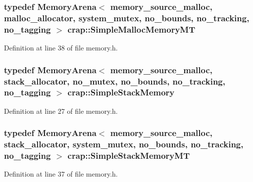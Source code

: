 \hypertarget{namespacecrap_a86d2d770530309cb5cb92249b5efadcb}{
\subsubsection[{Simple\+Malloc\+Memory\+M\+T}]{\setlength{\rightskip}{0pt plus 5cm}typedef {\bf Memory\+Arena}$<$ {\bf memory\+\_\+source\+\_\+malloc}, {\bf malloc\+\_\+allocator}, {\bf system\+\_\+mutex}, {\bf no\+\_\+bounds}, {\bf no\+\_\+tracking}, {\bf no\+\_\+tagging} $>$ {\bf crap\+::\+Simple\+Malloc\+Memory\+M\+T}}}\label{namespacecrap_a86d2d770530309cb5cb92249b5efadcb}


Definition at line 38 of file memory.\+h.

\hypertarget{namespacecrap_a1265b2d1470f9e9196ec1ffcb2fd0701}{
\subsubsection[{Simple\+Stack\+Memory}]{\setlength{\rightskip}{0pt plus 5cm}typedef {\bf Memory\+Arena}$<$ {\bf memory\+\_\+source\+\_\+malloc}, {\bf stack\+\_\+allocator}, {\bf no\+\_\+mutex}, {\bf no\+\_\+bounds}, {\bf no\+\_\+tracking}, {\bf no\+\_\+tagging} $>$ {\bf crap\+::\+Simple\+Stack\+Memory}}}\label{namespacecrap_a1265b2d1470f9e9196ec1ffcb2fd0701}


Definition at line 27 of file memory.\+h.

\hypertarget{namespacecrap_aa7a4e4bf8df096c0ab06b0fdbf4c3c0f}{
\subsubsection[{Simple\+Stack\+Memory\+M\+T}]{\setlength{\rightskip}{0pt plus 5cm}typedef {\bf Memory\+Arena}$<$ {\bf memory\+\_\+source\+\_\+malloc}, {\bf stack\+\_\+allocator}, {\bf system\+\_\+mutex}, {\bf no\+\_\+bounds}, {\bf no\+\_\+tracking}, {\bf no\+\_\+tagging} $>$ {\bf crap\+::\+Simple\+Stack\+Memory\+M\+T}}}\label{namespacecrap_aa7a4e4bf8df096c0ab06b0fdbf4c3c0f}


Definition at line 37 of file memory.\+h.

